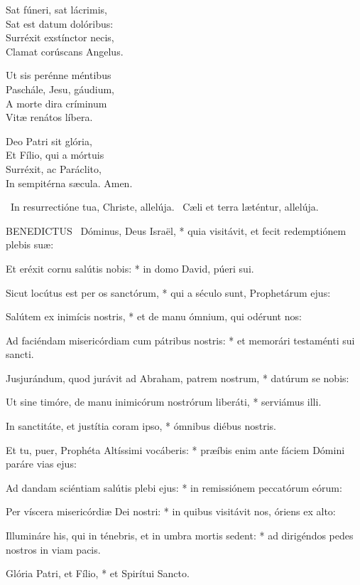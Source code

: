 Sat fúneri, sat lácrimis,\\
Sat est datum dolóribus:\\
Surréxit exstínctor necis,\\
Clamat corúscans Angelus.

Ut sis perénne méntibus\\
Paschále, Jesu, gáudium,\\
A morte dira críminum\\
Vitæ renátos líbera.

Deo Patri sit glória,\\
Et Fílio, qui a mórtuis\\
Surréxit, ac Paráclito,\\
In sempitérna sæcula. Amen.

\V\ In resurrectióne tua, Christe, allelúja. \R\ Cæli et terra læténtur, allelúja.



\lettrine[lines=2]{B}{ENEDICTUS} \textdagger\ Dóminus, Deus Israël, * quia visitávit, et fecit redemptiónem plebis suæ:

Et eréxit cornu salútis nobis: * in domo David, púeri sui.

Sicut locútus est per os sanctórum, * qui a século sunt, Prophetárum ejus:

Salútem ex inimícis nostris, * et de manu ómnium, qui odérunt nos:

Ad faciéndam misericórdiam cum pátribus nostris: * et memorári testaménti sui sancti.

Jusjurándum, quod jurávit ad Abraham, patrem nostrum, * datúrum se nobis:

Ut sine timóre, de manu inimicórum nostrórum liberáti, * serviámus illi.

In sanctitáte, et justítia coram ipso, * ómnibus diébus nostris.

Et tu, puer, Prophéta Altíssimi vocáberis: * præíbis enim ante fáciem Dómini paráre vias ejus:

Ad dandam sciéntiam salútis plebi ejus: * in remissiónem peccatórum eórum:

Per víscera misericórdiæ Dei nostri: * in quibus visitávit nos, óriens ex alto:

Illumináre his, qui in ténebris, et in umbra mortis sedent: * ad dirigéndos pedes nostros in viam pacis.

Glória Patri, et Fílio, * et Spirítui Sancto.

